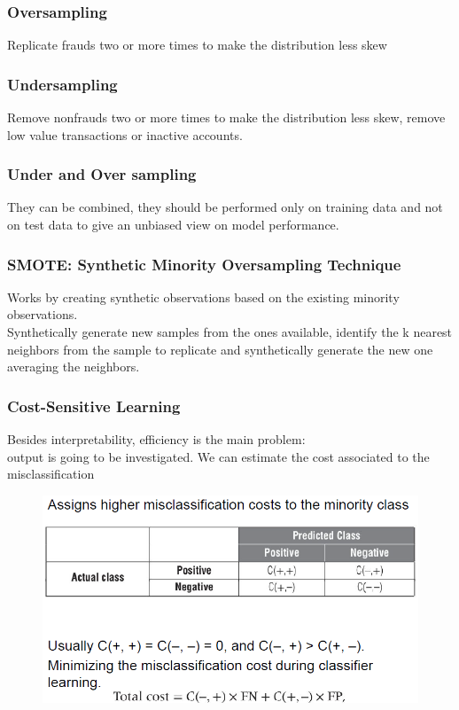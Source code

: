         \subsubsection{Oversampling}
            Replicate frauds two or more times to make the distribution less skew
        \subsubsection{Undersampling}
            Remove nonfrauds two or more times to make the distribution less skew, remove low value transactions or inactive accounts.
        \subsubsection{Under and Over sampling}
            They can be combined, they should be performed only on training data and not on test data to give an unbiased view on model performance.
        \subsubsection{SMOTE: Synthetic Minority Oversampling Technique}
            Works by creating synthetic observations based on the existing minority observations.\\
            Synthetically generate new samples from the ones available, identify the k nearest neighbors from the sample to replicate and synthetically generate the new one averaging the neighbors.
        \subsubsection{Cost-Sensitive Learning}
            Besides interpretability, efficiency is the main problem:\\
            output is going to be investigated. We can estimate the cost associated to the misclassification 
            \begin{figure}[ht!]
                \centering
                \includegraphics[width=0.6\linewidth]{lecture_16/last.png}
            \end{figure}